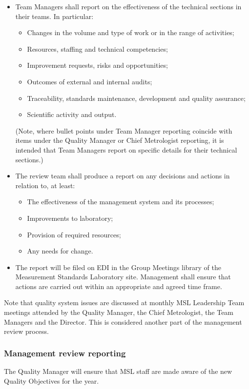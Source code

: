 \begin{itemize}
\item Team Managers shall report on the effectiveness of the technical sections in their teams. In particular: 
\begin{itemize}
\item Changes in the volume and type of work or in the range of activities;
\item Resources, staffing and technical competencies;
\item Improvement requests, risks and opportunities;
\item Outcomes of external and internal audits;
\item Traceability, standards maintenance, development and quality assurance;
\item Scientific activity and output.
\end{itemize}
(Note, where bullet points under Team Manager reporting coincide with items under the Quality Manager or Chief Metrologist reporting, it is intended that Team Managers report on specific details for their technical sections.) 
\item The review team shall produce a report on any decisions and actions in relation to, at least:
\begin{itemize}
\item The effectiveness of the management system and its processes;
\item Improvements to laboratory;
\item Provision of required resources;
\item Any needs for change.
\end{itemize}
\item The report will be filed on EDI in the Group Meetings library of the Measurement Standards Laboratory site. Management shall ensure that actions are carried out within an appropriate and agreed time frame.
\end{itemize}

Note that quality system issues are discussed at monthly MSL Leadership Team meetings attended by the Quality Manager, the Chief Metrologist, the Team Managers and the Director. This is considered another part of the management review process.
\subsubsection{Management review reporting}
The Quality Manager will ensure that MSL staff are made aware of the new Quality Objectives for the year.
